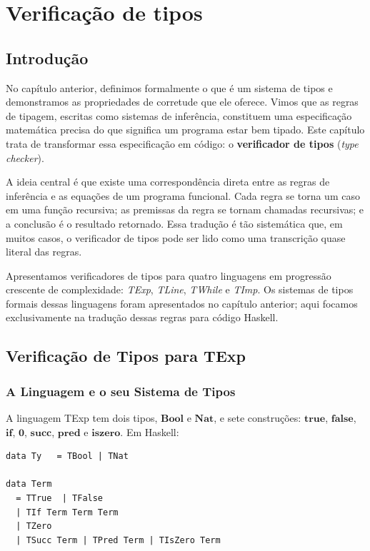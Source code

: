 \chapter{Verificação de tipos}

\section{Introdução}

No capítulo anterior, definimos formalmente o que é um sistema de
tipos e demonstramos as propriedades de corretude que ele oferece.
Vimos que as regras de tipagem, escritas como sistemas de inferência,
constituem uma especificação matemática precisa do que significa um
programa estar bem tipado. Este capítulo trata de transformar essa
especificação em código: o \textbf{verificador de tipos} (\emph{type checker}).

A ideia central é que existe uma correspondência direta entre as
regras de inferência e as equações de um programa funcional. Cada
regra se torna um caso em uma função recursiva; as premissas da regra
se tornam chamadas recursivas; e a conclusão é o resultado retornado.
Essa tradução é tão sistemática que, em muitos casos, o verificador
de tipos pode ser lido como uma transcrição quase literal das regras.

Apresentamos verificadores de tipos para quatro linguagens em
progressão crescente de complexidade: \emph{TExp}, \emph{TLine},
\emph{TWhile} e \emph{TImp}. Os sistemas de tipos formais dessas
linguagens foram apresentados no capítulo anterior; aqui focamos
exclusivamente na tradução dessas regras para código Haskell.

\section{Verificação de Tipos para TExp}

\subsection{A Linguagem e o seu Sistema de Tipos}

A linguagem TExp tem dois tipos, \(\mathbf{Bool}\) e
\(\mathbf{Nat}\), e sete construções: \(\mathbf{true}\),
\(\mathbf{false}\), \(\mathbf{if}\), \(\mathbf{0}\),
\(\mathbf{succ}\), \(\mathbf{pred}\) e \(\mathbf{iszero}\). Em Haskell:

\begin{verbatim}
data Ty   = TBool | TNat

data Term
  = TTrue  | TFalse
  | TIf Term Term Term
  | TZero
  | TSucc Term | TPred Term | TIsZero Term
\end{verbatim}


